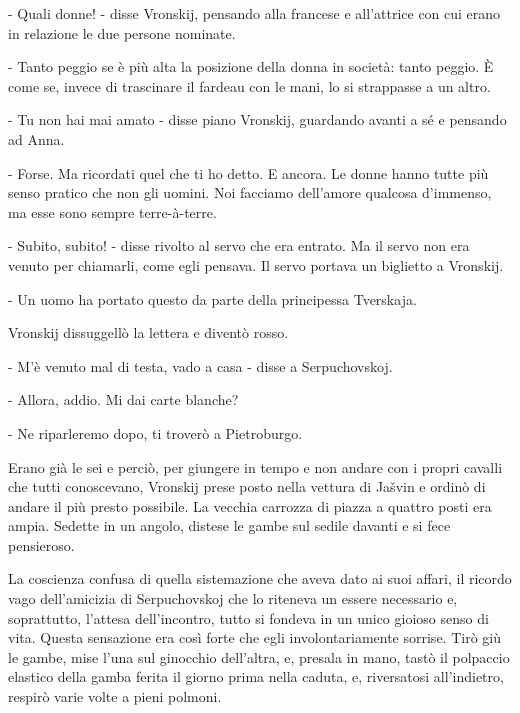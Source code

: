 - Quali donne! - disse Vronskij, pensando alla francese e all'attrice con cui erano in relazione le due persone nominate. 

- Tanto peggio se è più alta la posizione della donna in società: tanto peggio. È come se, invece di trascinare il fardeau con le mani, lo si strappasse a un altro. 

- Tu non hai mai amato - disse piano Vronskij, guardando avanti a sé e pensando ad Anna. 

- Forse. Ma ricordati quel che ti ho detto. E ancora. Le donne hanno tutte più senso pratico che non gli uomini. Noi facciamo dell'amore qualcosa d'immenso, ma esse sono sempre terre-à-terre. 

- Subito, subito! - disse rivolto al servo che era entrato. Ma il servo non era venuto per chiamarli, come egli pensava. Il servo portava un biglietto a Vronskij. 

- Un uomo ha portato questo da parte della principessa Tverskaja. 

Vronskij dissuggellò la lettera e diventò rosso. 

- M'è venuto mal di testa, vado a casa - disse a Serpuchovskoj. 

- Allora, addio. Mi dai carte blanche? 

- Ne riparleremo dopo, ti troverò a Pietroburgo. 

Erano già le sei e perciò, per giungere in tempo e non andare con i propri cavalli che tutti conoscevano, Vronskij prese posto nella vettura di Jašvin e ordinò di andare il più presto possibile. La vecchia carrozza di piazza a quattro posti era ampia. Sedette in un angolo, distese le gambe sul sedile davanti e si fece pensieroso. 

La coscienza confusa di quella sistemazione che aveva dato ai suoi affari, il ricordo vago dell'amicizia di Serpuchovskoj che lo riteneva un essere necessario e, soprattutto, l'attesa dell'incontro, tutto si fondeva in un unico gioioso senso di vita. Questa sensazione era così forte che egli involontariamente sorrise. Tirò giù le gambe, mise l'una sul ginocchio dell'altra, e, presala in mano, tastò il polpaccio elastico della gamba ferita il giorno prima nella caduta, e, riversatosi all'indietro, respirò varie volte a pieni polmoni. 

